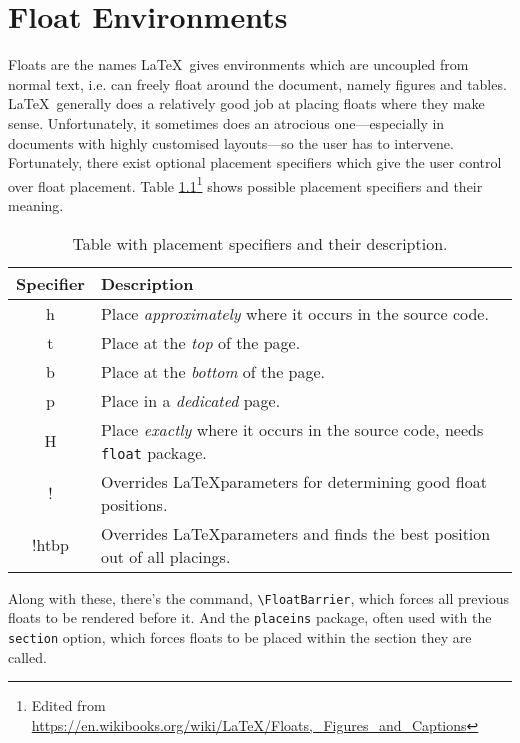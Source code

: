 \chapter{Float Environments}
%
Floats are the names \LaTeX~gives environments which are uncoupled from normal text, i.e. can freely float around the document, namely figures and tables. \LaTeX~generally does a relatively good job at placing floats where they make sense. Unfortunately, it sometimes does an atrocious one---especially in documents with highly customised layouts---so the user has to intervene. Fortunately, there exist optional placement specifiers which give the user control over float placement. Table \ref{t:placspec}\footnote{Edited from \url{https://en.wikibooks.org/wiki/LaTeX/Floats,_Figures_and_Captions}} shows possible placement specifiers and their meaning.
\begin{table}[!htbp]
    \centering
    \caption{Table with placement specifiers and their description.}
    \label{t:placspec}
    \begin{tabular}{cl}
        \toprule
        Specifier & Description\\
        \midrule
        h   & Place \emph{approximately} where it occurs in the source code.\\
        t   & Place at the \emph{top} of the page.\\
        b   & Place at the \emph{bottom} of the page.\\
        p   & Place in a \emph{dedicated} page.\\
        H   & Place \emph{exactly} where it occurs in the source code, needs \verb|float| package.\\
        !   & Overrides \LaTeX parameters for determining good float positions.\\
        !htbp   & Overrides \LaTeX parameters and finds the best position out of all placings.\\
        \bottomrule
    \end{tabular}
\end{table}

Along with these, there's the command, \verb|\FloatBarrier|, which forces all previous floats to be rendered before it. And the \verb|placeins| package, often used with the \verb|section| option, which forces floats to be placed within the section they are called.

